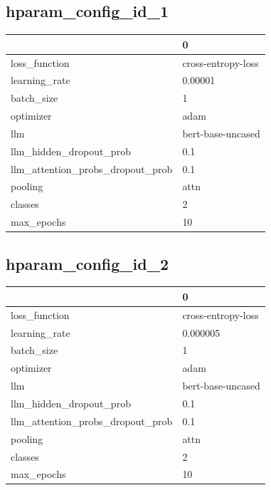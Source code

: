 \documentclass{article}
\begin{document}
\subsection{hparam\_config\_id\_1}
\begin{tabular}{ll}
\toprule
{} &                   0 \\
\midrule
loss\_function                    &  cross-entropy-loss \\
learning\_rate                    &             0.00001 \\
batch\_size                       &                   1 \\
optimizer                        &                adam \\
llm                              &   bert-base-uncased \\
llm\_hidden\_dropout\_prob          &                 0.1 \\
llm\_attention\_probs\_dropout\_prob &                 0.1 \\
pooling                          &                attn \\
classes                          &                   2 \\
max\_epochs                       &                  10 \\
\bottomrule
\end{tabular}

\subsection{hparam\_config\_id\_2}
\begin{tabular}{ll}
\toprule
{} &                   0 \\
\midrule
loss\_function                    &  cross-entropy-loss \\
learning\_rate                    &            0.000005 \\
batch\_size                       &                   1 \\
optimizer                        &                adam \\
llm                              &   bert-base-uncased \\
llm\_hidden\_dropout\_prob          &                 0.1 \\
llm\_attention\_probs\_dropout\_prob &                 0.1 \\
pooling                          &                attn \\
classes                          &                   2 \\
max\_epochs                       &                  10 \\
\bottomrule
\end{tabular}
\end{document}
